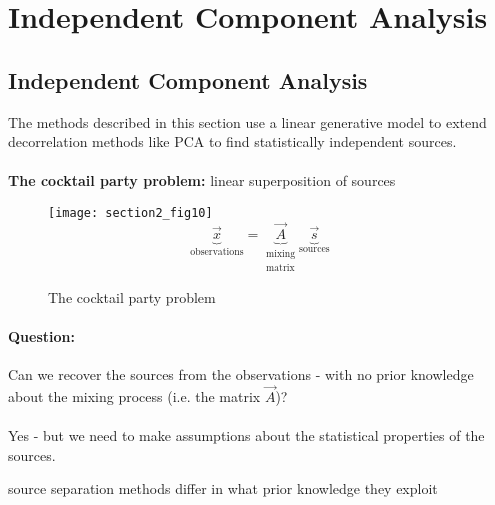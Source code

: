 		

\newpage 						%
\section{Independent Component Analysis}
\subsection{Independent Component Analysis}
\label{sec:ICA}
The methods described in this section use a linear generative model to extend decorrelation methods like PCA to find statistically independent sources.\\\\
\textbf{The cocktail party problem:} linear superposition of sources

\begin{figure}[h]
  \centering
\texttt{[image: section2\_fig10]}  
\begin{equation}
	\underbrace{ \vec{x} }_{ \text{observations} } 
	= \underbrace{ \vec{A} }_{ \substack{ 	\text{mixing} \\
						\text{matrix}} }
	\underbrace{ \vec{s} }_{ \text{sources} }
\end{equation}

  \caption{The cocktail party problem}
  \label{fig:cocktailParty}
\end{figure}


\paragraph{Question:}
Can we recover the sources from the observations - with no prior knowledge about the mixing process (i.e. the matrix $\vec{A}$)?
\\\\
Yes - but we need to make assumptions about the statistical properties of the sources. 
\begin{itemize}
	\itl source separation methods differ in what prior knowledge they exploit
\end{itemize}

